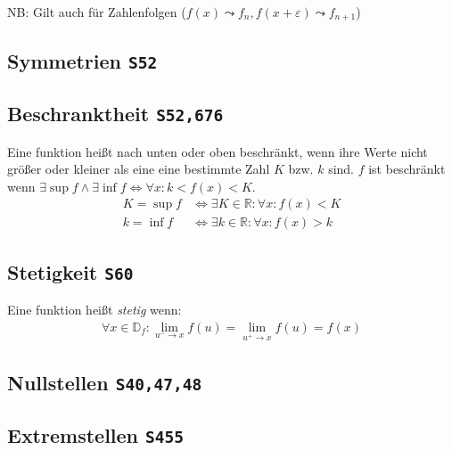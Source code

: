 \documentclass[a4paper, twocolumn]{article}
\newcommand{\nset}[1]{\ensuremath{\mathbb{#1}}}
\newcommand{\brpage}[1]{\textcolor{red!70!black}{\small\texttt{S#1}}}
\begin{document}
\footnotesize{NB: Gilt auch f\"ur Zahlenfolgen (\(f(x) \leadsto f_n, f(x+\varepsilon) \leadsto f_{n+1}\))

\subsection{Symmetrien \brpage{52}}
\begin{center}
\end{center}

\subsection{Beschranktheit \brpage{52,676}}
Eine funktion hei{\ss}t nach unten oder oben beschr\"ankt, wenn ihre Werte nicht gr\"o{\ss}er oder kleiner als eine eine bestimmte Zahl \(K\) bzw. \(k\) sind.
\(f\) ist beschr\"ankt wenn \(\exists \sup f \wedge \exists \inf f \iff \forall x: k < f(x) < K\).
\begin{align*}
  K = \sup f &\iff \exists K \in \nset{R} : \forall x : f(x) < K \\
  k = \inf f &\iff \exists k \in \nset{R} : \forall x : f(x) > k
\end{align*}

\subsection{Stetigkeit \brpage{60}}
Eine funktion hei{\ss}t \emph{stetig} wenn:
\begin{align*}
  \forall x \in \mathbb{D}_f : \lim_{u^{-} \to x} f(u) = \lim_{u^{+} \to x} f(u) = f(x)
\end{align*}

\subsection{Nullstellen \brpage{40,47,48}}
\subsection{Extremstellen \brpage{455}}
}
\end{document}
